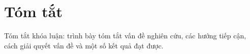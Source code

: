 \chapter*{Tóm tắt}
\label{tomtat}

Tóm tắt khóa luận: trình bày tóm tắt vấn đề nghiên cứu, các hướng tiếp cận, cách giải quyết vấn đề và một số kết quả đạt được.